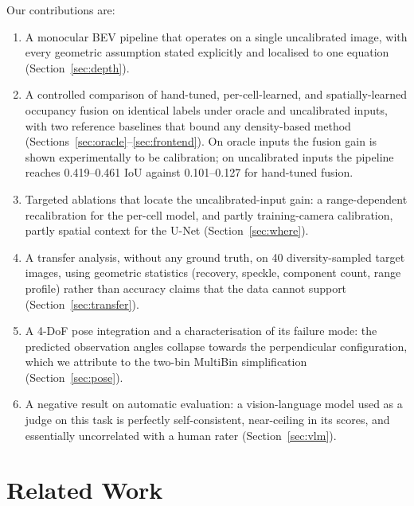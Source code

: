 \documentclass[sigconf]{acmart}
\newcommand{\rev}[1]{{\color{revcolor}#1}}
\begin{document}
Our contributions are:
\begin{enumerate}
\item A monocular BEV pipeline that operates on a single uncalibrated image, with every geometric assumption stated explicitly and localised to one equation (Section~\ref{sec:depth}).
\item \rev{A controlled comparison of hand-tuned, per-cell-learned, and spatially-learned occupancy fusion on identical labels under oracle and uncalibrated inputs, with two reference baselines that bound any density-based method (Sections~\ref{sec:oracle}--\ref{sec:frontend}). On oracle inputs the fusion gain is shown experimentally to be calibration; on uncalibrated inputs the pipeline reaches 0.419--0.461 IoU against 0.101--0.127 for hand-tuned fusion.}
\item \rev{Targeted ablations that locate the uncalibrated-input gain: a range-dependent recalibration for the per-cell model, and partly training-camera calibration, partly spatial context for the U-Net (Section~\ref{sec:where}).}
\item A transfer analysis, without any ground truth, on 40 diversity-sampled target images, using geometric statistics (recovery, speckle, component count, range profile) rather than accuracy claims that the data cannot support (Section~\ref{sec:transfer}).
\item A 4-DoF pose integration and a characterisation of its failure mode: the predicted observation angles collapse towards the perpendicular configuration, which we attribute to the two-bin MultiBin simplification (Section~\ref{sec:pose}).
\item A negative result on automatic evaluation: a vision-language model used as a judge on this task is perfectly self-consistent, near-ceiling in its scores, and essentially uncorrelated with a human rater (Section~\ref{sec:vlm}).
\end{enumerate}

\section{Related Work}
\end{document}
